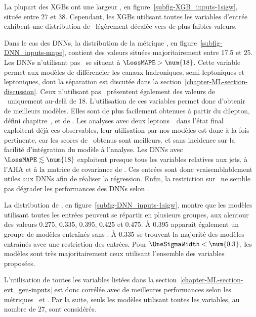 \par
La plupart des XGBs ont
une largeur \OneSigmaWidth, en figure~\ref{subfig-XGB_inputs-1sigw},
située entre \num{27} et \num{38}.
Cependant,
les XGBs utilisant toutes les variables d'entrée
exhibent une distribution de \OneSigmaWidth\ légèrement décalée vers de plus faibles valeurs.
\par
Dans le cas des DNNs,
la distribution de la métrique \LossMAPE, en figure~\ref{subfig-DNN_inputs-mape},
contient des valeurs situées majoritairement entre \num{17.5} et \num{25}.
Les DNNs n'utilisant pas \Nnu\
se situent à $\LossMAPE>\num{18}$.
Cette variable permet aux modèles de différencier les canaux
hadroniques, semi-leptoniques et leptoniques,
dont la séparation est discutée dans la section~\ref{chapter-ML-section-discussion}.
Ceux n'utilisant pas \mT\ présentent également des valeurs de \LossMAPE\ uniquement au-delà de \num{18}.
L'utilisation de ces variables permet donc d'obtenir de meilleurs modèles.
Elles sont de plus facilement obtenues à partir du dilepton, défini chapitre~, et de \MET.
Les analyses avec deux leptons~\tau\ dans l'état final exploitent déjà ces observables,
leur utilisation par nos modèles est donc à la fois
pertinente, car les scores de \LossMAPE\ obtenus sont meilleurs,
et
sans incidence sur la facilité d'intégration du modèle à l'analyse.
Les DNNs avec $\LossMAPE\lesssim\num{18}$
exploitent presque tous
les variables relatives aux jets, à l'AHA et à la matrice de covariance de \MET.
Ces entrées sont donc vraisemblablement utiles aux DNNs afin de réaliser la régression.
Enfin,
la restriction sur \Npu\
ne semble pas dégrader les performances des DNNs
selon \LossMAPE.
\par
La distribution de
\OneSigmaWidth, en figure~\ref{subfig-DNN_inputs-1sigw},
montre que les modèles utilisant toutes les entrées peuvent se répartir en plusieurs groupes,
aux alentour des valeurs
\num{0.275}, \num{0.335}, \num{0.395}, \num{0.425} et \num{0.475}.
À \num{0.395} apparaît également un groupe de modèles entraînés sans \mT.
À \num{0.335} se trouvent la majorité des modèles entraînés avec une restriction des entrées.
Pour $\OneSigmaWidth<\num{0.3}$, les modèles sont très majoritairement ceux utilisant l'ensemble des variables proposées.
\par
L'utilisation de toutes les variables listées dans la section~\ref{chapter-ML-section-evt_gen-inputs}
est donc corrélée avec de meilleures performances
selon les métriques
\LossMAPE\
et
\OneSigmaWidth.
Par la suite, seuls les modèles utilisant toutes les variables, au nombre de 27, sont considérés.
